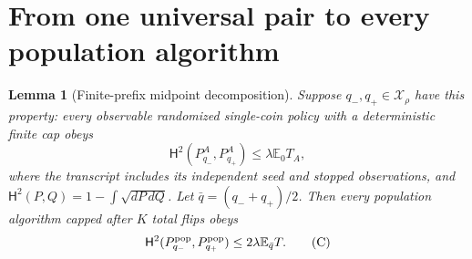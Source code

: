 \documentclass[11pt]{article}
\newtheorem{lemma}[theorem]{Lemma}
\newcommand{\E}{\mathbb E}
\newcommand{\Hsq}{\mathsf H^2}
\newcommand{\Xrho}{\mathcal X_\rho}
\begin{document}
\section{From one universal pair to every population algorithm}
\begin{lemma}[Finite-prefix midpoint decomposition]\label{lem:population-prefix}
Suppose $q_-,q_+\in\Xrho$ have this property: every observable randomized
single-coin policy with a deterministic finite cap obeys
\[
 \Hsq(P^A_{q_-},P^A_{q_+})\le\lambda\E_0 T_A,           \tag{B}
\]
where the transcript includes its independent seed and stopped observations,
and $\Hsq(P,Q)=1-\int\sqrt{dP\,dQ}$. Let $\bar q=(q_-+q_+)/2$.
Then every population algorithm capped after $K$ total flips obeys
\[
 \Hsq(P_{q_-}^{\rm pop},P_{q_+}^{\rm pop})
       \le2\lambda\E_{\bar q}T.                       \tag{C}
\]
\end{lemma}
\end{document}
